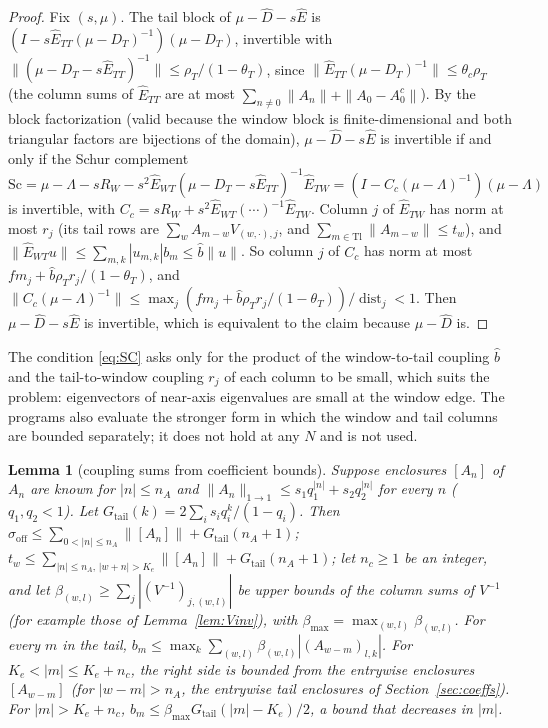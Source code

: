 \documentclass[11pt]{article}
\newtheorem{lemma}{Lemma}[section]
\theoremstyle{definition}
\begin{document}
\begin{proof}
Fix $(s, \mu)$. The tail block of $\mu - \hat D - s\hat E$ is $(I - s\hat E_{TT}(\mu - D_T)^{-1})(\mu - D_T)$, invertible with $\|(\mu - D_T - s\hat E_{TT})^{-1}\| \le \rho_T/(1 - \theta_T)$, since $\|\hat E_{TT}(\mu - D_T)^{-1}\| \le \theta_c\rho_T$ (the column sums of $\hat E_{TT}$ are at most $\sum_{n\ne0}\|A_n\| + \|A_0 - A_0^c\|$). By the block factorization (valid because the window block is finite-dimensional and both triangular factors are bijections of the domain), $\mu - \hat D - s\hat E$ is invertible if and only if the Schur complement
\[ \mathrm{Sc} = \mu - \Lambda - sR_W - s^2\hat E_{WT}(\mu - D_T - s\hat E_{TT})^{-1}\hat E_{TW} = (I - C_c(\mu - \Lambda)^{-1})(\mu - \Lambda) \]
is invertible, with $C_c = sR_W + s^2\hat E_{WT}(\cdots)^{-1}\hat E_{TW}$. Column $j$ of $\hat E_{TW}$ has norm at most $r_j$ (its tail rows are $\sum_w A_{m-w}V_{(w,\cdot),j}$, and $\sum_{m\in\mathrm{Tl}}\|A_{m-w}\| \le t_w$), and $\|\hat E_{WT}u\| \le \sum_{m,k}|u_{m,k}|b_m \le \hat b\|u\|$. So column $j$ of $C_c$ has norm at most $f\!m_j + \hat b\rho_Tr_j/(1 - \theta_T)$, and $\|C_c(\mu - \Lambda)^{-1}\| \le \max_j(f\!m_j + \hat b\rho_Tr_j/(1 - \theta_T))/\operatorname{dist}_j < 1$. Then $\mu - \hat D - s\hat E$ is invertible, which is equivalent to the claim because $\mu - \hat D$ is.
\end{proof}

The condition \eqref{eq:SC} asks only for the product of the window-to-tail coupling $\hat b$ and the tail-to-window coupling $r_j$ of each column to be small, which suits the problem: eigenvectors of near-axis eigenvalues are small at the window edge. The programs also evaluate the stronger form in which the window and tail columns are bounded separately; it does not hold at any $N$ and is not used.

\begin{lemma}[coupling sums from coefficient bounds]\label{lem:coupling}
Suppose enclosures $[A_n]$ of $A_n$ are known for $|n| \le n_A$ and $\|A_n\|_{1\to1} \le s_1q_1^{|n|} + s_2q_2^{|n|}$ for every $n$ ($q_1, q_2 < 1$). Let $G_{\mathrm{tail}}(k) = 2\sum_i s_iq_i^k/(1 - q_i)$. Then $\sigma_{\mathrm{off}} \le \sum_{0<|n|\le n_A}\|[A_n]\| + G_{\mathrm{tail}}(n_A + 1)$; $t_w \le \sum_{|n|\le n_A,\,|w+n|>K_e}\|[A_n]\| + G_{\mathrm{tail}}(n_A + 1)$; let $n_c \ge 1$ be an integer, and let $\beta_{(w,l)} \ge \sum_j|(V^{-1})_{j,(w,l)}|$ be upper bounds of the column sums of $V^{-1}$ (for example those of Lemma~\ref{lem:Vinv}), with $\beta_{\max} = \max_{(w,l)}\beta_{(w,l)}$. For every $m$ in the tail, $b_m \le \max_k\sum_{(w,l)}\beta_{(w,l)}|(A_{w-m})_{l,k}|$. For $K_e < |m| \le K_e + n_c$, the right side is bounded from the entrywise enclosures $[A_{w-m}]$ (for $|w - m| > n_A$, the entrywise tail enclosures of Section~\ref{sec:coeffs}). For $|m| > K_e + n_c$, $b_m \le \beta_{\max}G_{\mathrm{tail}}(|m| - K_e)/2$, a bound that decreases in $|m|$.
\end{lemma}
\end{document}
